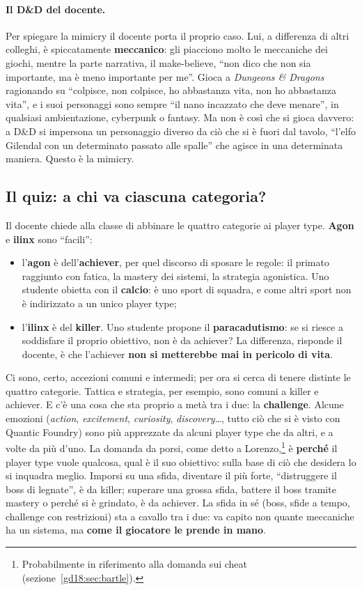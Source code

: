 \paragraph{Il D\&D del docente.} Per spiegare la mimicry il docente porta il proprio
caso. Lui, a differenza di altri colleghi, è spiccatamente \textbf{meccanico}: gli
piacciono molto le meccaniche dei giochi, mentre la parte narrativa, il
make-believe, ``non dico che non sia importante, ma è meno importante per me''.
Gioca a \emph{Dungeons \& Dragons} ragionando su ``colpisce, non colpisce, ho
abbastanza vita, non ho abbastanza vita'', e i suoi personaggi sono sempre ``il nano
incazzato che deve menare'', in qualsiasi ambientazione, cyberpunk o fantasy. Ma non
è così che si gioca davvero: a D\&D si impersona un personaggio diverso da ciò che
si è fuori dal tavolo, ``l'elfo Gilendal con un determinato passato alle spalle'' che
agisce in una determinata maniera. Questo è la mimicry.

\subsection{Il quiz: a chi va ciascuna categoria?}

Il docente chiede alla classe di abbinare le quattro categorie ai player type.
\textbf{Agon} e \textbf{ilinx} sono ``facili'':
\begin{itemize}
  \item l'\textbf{agon} è dell'\textbf{achiever}, per quel discorso di sposare le
        regole: il primato raggiunto con fatica, la mastery dei sistemi, la strategia
        agonistica. Uno studente obietta con il \textbf{calcio}: è uno sport di
        squadra, e come altri sport non è indirizzato a un unico player type;
  \item l'\textbf{ilinx} è del \textbf{killer}. Uno studente propone il
        \textbf{paracadutismo}: se si riesce a soddisfare il proprio obiettivo, non è
        da achiever? La differenza, risponde il docente, è che l'achiever
        \textbf{non si metterebbe mai in pericolo di vita}.
\end{itemize}
Ci sono, certo, accezioni comuni e intermedi; per ora si cerca di tenere distinte le
quattro categorie. Tattica e strategia, per esempio, sono comuni a killer e
achiever. E c'è una cosa che sta proprio a metà tra i due: la
\textbf{challenge}. Alcune emozioni (\emph{action}, \emph{excitement},
\emph{curiosity}, \emph{discovery}\dots, tutto ciò che si è visto con Quantic
Foundry) sono più apprezzate da alcuni player type che da altri, e a volte da più
d'uno. La domanda da porsi, come detto a Lorenzo,\footnote{Probabilmente in
riferimento alla domanda sui cheat (sezione~\ref{gd18:sec:bartle}).} è
\textbf{perché} il player type vuole qualcosa, qual è il suo obiettivo: sulla base
di ciò che desidera lo si inquadra meglio. Imporsi su una sfida, diventare il più
forte, ``distruggere il boss di legnate'', è da killer; superare una grossa sfida,
battere il boss tramite mastery o perché si è grindato, è da achiever. La sfida in
sé (boss, sfide a tempo, challenge con restrizioni) sta a cavallo tra i due: va
capito non quante meccaniche ha un sistema, ma \textbf{come il giocatore le prende in
mano}.

